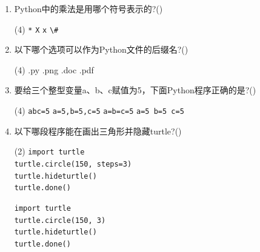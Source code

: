 \documentclass[11pt]{ctexart}
\begin{document}
\begin{enumerate}
         \lstinline{<=} 表示为小于等于，如果左边的数小于或等于右边的数，则为 \lstinline{True}

         若\lstinline{a = 2}, \lstinline{b = 5} 则 \lstinline{a != b} 为 \lstinline{True}
        \begin{tasks}(4)
            \task {}
            \task {}
            \task {}
            \task {}
        \end{tasks}

        \item Python中的乘法是用哪个符号表示的?(\qquad)
        \begin{tasks}(4)
            \task \lstinline!*!
            \task \lstinline!X!
            \task \lstinline!x!
            \task \lstinline!\#!
        \end{tasks}

        \item 以下哪个选项可以作为Python文件的后缀名?(\qquad)
        \begin{tasks}(4)
            \task .py
            \task .png
            \task .doc
            \task .pdf
        \end{tasks}

        \item 要给三个整型变量a、b、c赋值为5，下面Python程序正确的是?(\qquad)
        \begin{tasks}(4)
            \task \lstinline!abc=5!
            \task \lstinline{a=5,b=5,c=5}
            \task \lstinline!a=b=c=5!
            \task \lstinline!a=5 b=5 c=5!
        \end{tasks}

        \item 以下哪段程序能在画出三角形并隐藏turtle?(\qquad)
        \begin{tasks}(2)
            \task 
            \lstinline!import turtle! \\ 
            \lstinline!turtle.circle(150, steps=3)! \\
            \lstinline!turtle.hideturtle()! \\
            \lstinline!turtle.done()!

            \task 
            \lstinline!import turtle! \\ 
            \lstinline!turtle.circle(150, 3)! \\
            \lstinline!turtle.hideturtle()! \\
            \lstinline!turtle.done()!


\end{tasks}
\end{enumerate}
\end{document}
